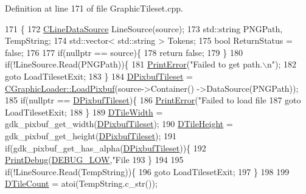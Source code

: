 Definition at line 171 of file Graphic\+Tileset.\+cpp.


\begin{DoxyCode}
171                                                                     \{
172     \hyperlink{classCLineDataSource}{CLineDataSource} LineSource(source);
173     std::string PNGPath, TempString;
174     std::vector< std::string > Tokens;
175     \textcolor{keywordtype}{bool} ReturnStatus = \textcolor{keyword}{false};
176     
177     \textcolor{keywordflow}{if}(\textcolor{keyword}{nullptr} == source)\{
178         \textcolor{keywordflow}{return} \textcolor{keyword}{false};   
179     \}
180     \textcolor{keywordflow}{if}(!LineSource.Read(PNGPath))\{
181         \hyperlink{Debug_8h_a2ed825eefefe35baf59a93a8c641323d}{PrintError}(\textcolor{stringliteral}{"Failed to get path.\(\backslash\)n"});
182         \textcolor{keywordflow}{goto} LoadTilesetExit;
183     \}
184     \hyperlink{classCGraphicTileset_a5d5adfcdbb347a6df3f57535ca08e3ef}{DPixbufTileset} = \hyperlink{classCGraphicLoader_ac7778dec4fd0ea51674f0b23f3029edf}{CGraphicLoader::LoadPixbuf}(source->Container()
      ->DataSource(PNGPath));
185     \textcolor{keywordflow}{if}(\textcolor{keyword}{nullptr} == \hyperlink{classCGraphicTileset_a5d5adfcdbb347a6df3f57535ca08e3ef}{DPixbufTileset})\{
186         \hyperlink{Debug_8h_a2ed825eefefe35baf59a93a8c641323d}{PrintError}(\textcolor{stringliteral}{"Failed to load file %
187         \textcolor{keywordflow}{goto} LoadTilesetExit;        
188     \}
189     \hyperlink{classCGraphicTileset_a2d0c7d19865b81911a3a43d5cae50e00}{DTileWidth} = gdk\_pixbuf\_get\_width(\hyperlink{classCGraphicTileset_a5d5adfcdbb347a6df3f57535ca08e3ef}{DPixbufTileset});
190     \hyperlink{classCGraphicTileset_af48f32e07d5fe69afd5f764318cc3244}{DTileHeight} = gdk\_pixbuf\_get\_height(\hyperlink{classCGraphicTileset_a5d5adfcdbb347a6df3f57535ca08e3ef}{DPixbufTileset});
191     \textcolor{keywordflow}{if}(gdk\_pixbuf\_get\_has\_alpha(\hyperlink{classCGraphicTileset_a5d5adfcdbb347a6df3f57535ca08e3ef}{DPixbufTileset}))\{
192         \hyperlink{Debug_8h_aa5f00f5537c9760f6ae1782460748ab9}{PrintDebug}(\hyperlink{Debug_8h_a3a5f3fc09784650d8388cb854882f840}{DEBUG\_LOW},\textcolor{stringliteral}{"File %
193     \}
194 
195     \textcolor{keywordflow}{if}(!LineSource.Read(TempString))\{
196         \textcolor{keywordflow}{goto} LoadTilesetExit;
197     \}
198 
199     \hyperlink{classCGraphicTileset_a39d942b370e47f441bf97385eb1037c8}{DTileCount} = atoi(TempString.c\_str());
}}
\end{DoxyCode}
